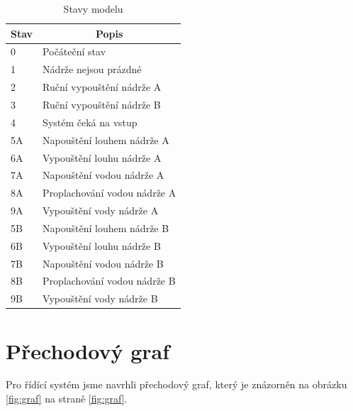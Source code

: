\documentclass[12pt]{report}
\begin{document}
	\begin{table}[]
		\centering
		\begin{tabular}{ll}
			\hline
			\multicolumn{1}{c}{Stav} 	 & \multicolumn{1}{c}{Popis}      \\ \hline
			0                            & Počáteční stav				  \\
			1                            & Nádrže nejsou prázdné          \\
			2                            & Ruční vypouštění nádrže A   	  \\ 
			3                            & Ruční vypouštění nádrže B   	  \\ 
			4                            & Systém čeká na vstup 		  \\ \hline
			5A                           & Napouštění louhem nádrže A     \\
			6A                           & Vypouštění louhu nádrže A      \\
			7A                           & Napouštění vodou nádrže A      \\
			8A                           & Proplachování vodou nádrže A   \\
			9A                           & Vypouštění vody nádrže A       \\ \hline
			5B                           & Napouštění louhem nádrže B     \\
			6B                           & Vypouštění louhu nádrže B      \\
			7B                           & Napouštění vodou nádrže B      \\
			8B                           & Proplachování vodou nádrže B   \\
			9B                           & Vypouštění vody nádrže B       \\ \hline
		\end{tabular}
		\caption{Stavy modelu}
		\label{tab:stavy}
	\end{table}
		
	\section{Přechodový graf}
	Pro řídící systém jsme navrhli přechodový graf, který je znázorněn na obrázku \ref{fig:graf} na straně \ref{fig:graf}.
		
\end{document}
